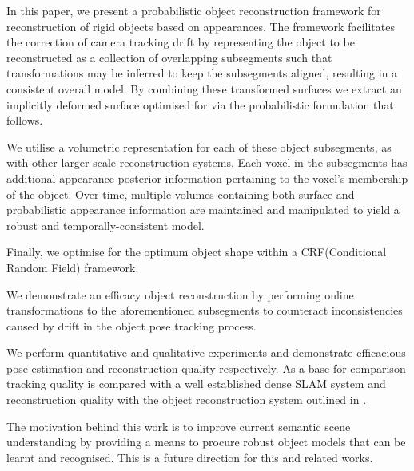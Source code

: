 In this paper, we present a probabilistic object reconstruction framework for reconstruction of rigid objects based on 
appearances. The framework facilitates the correction of camera tracking drift by representing the object to be reconstructed as a
collection of overlapping subsegments such that transformations may be inferred to keep the subsegments aligned, resulting in a consistent
overall model. By combining these transformed surfaces we extract an implicitly deformed surface optimised for via the probabilistic formulation 
that follows.

We utilise a volumetric representation for each of these object subsegments, as with other larger-scale reconstruction
systems\cite{Kahler2016}. Each voxel in the subsegments has additional appearance posterior information pertaining to the voxel's membership 
of the object. Over time, multiple volumes containing both surface and probabilistic appearance information are maintained and manipulated to 
yield a robust and temporally-consistent model.

Finally, we optimise for the optimum object shape within a CRF(Conditional Random Field) framework.

We demonstrate an efficacy object reconstruction by performing online transformations to the aforementioned subsegments to counteract inconsistencies caused by drift in the object pose tracking process.

We perform quantitative and qualitative experiments and demonstrate efficacious pose estimation and reconstruction quality respectively. As a base 
for comparison tracking quality is compared with a well established dense SLAM system \cite{Prisacariu2014} and reconstruction quality with the 
object reconstruction system outlined in \cite{Ren2013}.

The motivation behind this work is to improve current semantic scene understanding\cite{Valentin2015, Golodetz2015} by providing a means to procure 
robust object models that can be learnt and recognised. This is a future direction for this and related works.